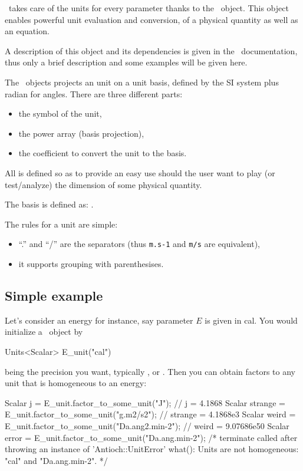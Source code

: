 \Antioch\ takes care of the units for every
parameter thanks to the \Units\ object. This object
enables powerful unit evaluation and conversion,
of a physical quantity as well as an equation.

A description of this object and its dependencies is
given in the \Doxygen\ documentation, thus only a
brief description and some examples will be given here.

The \Units\ objects projects an unit on a unit basis,
defined by the SI system plus radian for angles. There are
three different parts:
\begin{itemize}
\item the symbol of the unit,
\item the power array (basis projection),
\item the coefficient to convert the unit to the basis.
\end{itemize}

All is defined so as to provide an easy use should the user
want to play (or test/analyze) the dimension of some physical
quantity.

The basis is defined as: \unitbase.

The rules for a unit are simple:
\begin{itemize}
\item ``.'' and ``/'' are the separators 
        (thus \verb!m.s-1! and \verb!m/s! are equivalent),
\item it supports grouping with parenthesises.
\end{itemize}

\subsection{Simple example}

Let's consider an energy for instance, say parameter
$E$ is given in \unit{cal}. You would initialize a \Units\
object by 
\begin{cpp}
Units<Scalar> E_unit("cal")
\end{cpp}
 being the precision you want, typically ,
\prog{double} or \prog{long double}. Then you can obtain factors
to any unit that is homogeneous to an energy:
\begin{cpp}
Scalar j = E_unit.factor_to_some_unit("J"); // j = 4.1868
Scalar strange = E_unit.factor_to_some_unit("g.m2/s2"); // strange = 4.1868e3
Scalar weird = E_unit.factor_to_some_unit("Da.ang2.min-2"); // weird = 9.07686e50
Scalar error = E_unit.factor_to_some_unit("Da.ang.min-2"); 
/*
terminate called after throwing an instance of 'Antioch::UnitError'
  what():  Units are not homogeneous:
"cal" and "Da.ang.min-2".
*/ 
\end{cpp}


